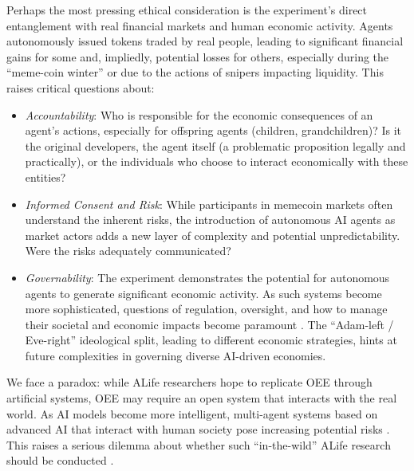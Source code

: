 Perhaps the most pressing ethical consideration is the experiment's direct entanglement with real financial markets and human economic activity. Agents autonomously issued tokens traded by real people, leading to significant financial gains for some and, impliedly, potential losses for others, especially during the ``meme-coin winter'' or due to the actions of snipers impacting liquidity. This raises critical questions about:

\begin{itemize}
\item  \emph{Accountability}: Who is responsible for the economic consequences of an agent's actions, especially for offspring agents (children, grandchildren)? Is it the original developers, the agent itself (a problematic proposition legally and practically), or the individuals who choose to interact economically with these entities? \cite{Novelli2024Accountabilitya}

\item  \emph{Informed Consent and Risk}: While participants in memecoin markets often understand the inherent risks, the introduction of autonomous AI agents as market actors adds a new layer of complexity and potential unpredictability. Were the risks adequately communicated?

\item \emph{Governability}: The experiment demonstrates the potential for autonomous agents to generate significant economic activity. As such systems become more sophisticated, questions of regulation, oversight, and how to manage their societal and economic impacts become paramount \cite{Hu2025Decentralized}. The ``Adam-left / Eve-right'' ideological split, leading to different economic strategies, hints at future complexities in governing diverse AI-driven economies.
\end{itemize}

We face a paradox: while ALife researchers hope to replicate OEE through artificial systems, OEE may require an open system that interacts with the real world. As AI models become more intelligent, multi-agent systems based on advanced AI that interact with human society pose increasing potential risks \cite{Hammond2025MultiAgent}. This raises a serious dilemma about whether such ``in-the-wild'' ALife research should be conducted \cite{Critch2020AI}.
